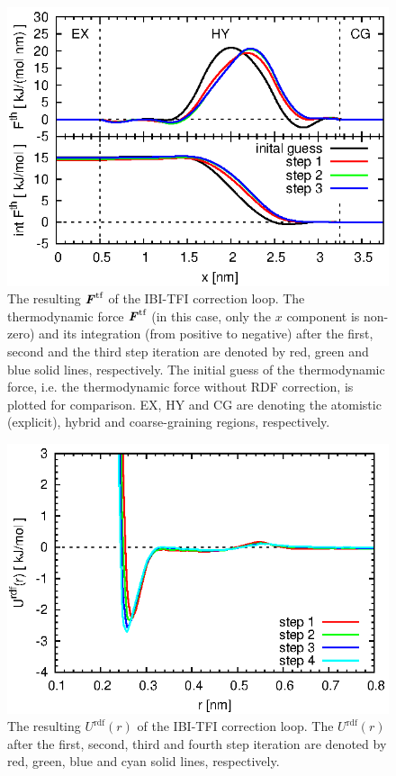 \documentclass[aps,pre,preprint,unsortedaddress]{revtex4}
\renewcommand{\v}[1]{\textbf{\textit{#1}}}
\begin{document}
\begin{figure}
  \centering
  \includegraphics{fig/tf-and-int.eps}
  \caption{The resulting $\v F^{\textrm{tf}}$ of the IBI-TFI
    correction loop.  The thermodynamic force $\v F^{\textrm{tf}}$ (in
    this case, only the $x$ component is non-zero) and its
    integration (from positive to negative) after the first, second
    and the third step iteration are denoted by red, green and blue
    solid lines, respectively. The initial guess of the thermodynamic
    force, i.e. the thermodynamic force without RDF correction, is
    plotted for comparison. EX, HY and CG are denoting the atomistic
    (explicit), hybrid and coarse-graining regions, respectively.}
  \label{fig:tmp5}
\end{figure}

\begin{figure}
  \centering
  \includegraphics{fig/force-rdf.eps}
  \caption{The resulting $U^{\textrm{rdf}}(r)$ of the IBI-TFI
    correction loop.  The $U^{\textrm{rdf}}(r)$ after the first,
    second, third and fourth step iteration are denoted by red, green,
    blue and cyan solid lines, respectively.  }
  \label{fig:tmp6}
\end{figure}
\end{document}

